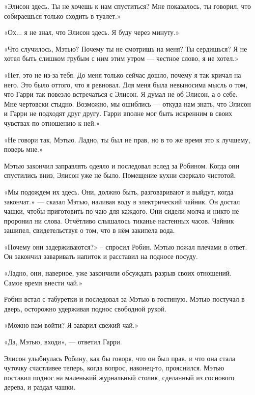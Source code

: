 \documentclass[a4paper,12pt]{book}
\begin{document}
\par
«Элисон здесь. Ты не хочешь к нам спуститься? Мне показалось, ты говорил, что собираешься только сходить в туалет.»
\par
«Ох... я не знал, что Элисон здесь. Я буду через минуту.»
\par
«Что случилось, Мэтью? Почему ты не смотришь на меня? Ты сердишься? Я не хотел быть слишком грубым с ним этим утром — честное слово, я не хотел.»
\par
«Нет, это не из-за тебя. До меня только сейчас дошло, почему я так кричал на него. Это было оттого, что я ревновал. Для меня была невыносима мысль о том, что Гарри так повезло встречаться с Элисон. Я думал не об Элисон, а о себе. Мне чертовски стыдно. Возможно, мы ошиблись — откуда нам знать, что Элисон и Гарри не подходят друг другу. Гарри вполне мог быть искренним в своих чувствах по отношению к ней.»
\par
«Не говори так, Мэтью. Ладно, ты был не прав, но в то же время это к лучшему, поверь мне.»\\
\par
Мэтью закончил заправлять одеяло и последовал вслед за Робином. Когда они спустились вниз, Элисон уже не было. Помещение кухни сверкало чистотой.
\par
«Мы подождем их здесь. Они, должно быть, разговаривают и выйдут, когда закончат.» — сказал Мэтью, наливая воду в электрический чайник. Он достал чашки, чтобы приготовить по чаю для каждого. Они сидели молча и никто не проронил ни слова. Отчётливо слышалось тиканье настенных часов. Чайник зашипел, свидетельствуя о том, что в нём закипела вода.
\par
«Почему они задерживаются?» – спросил Робин. Мэтью пожал плечами в ответ. Он закончил заваривать напиток и расставил на подносе посуду.
\par
«Ладно, они, наверное, уже закончили обсуждать разрыв своих отношений. Самое время внести чай.»
\par
Робин встал с табуретки и последовал за Мэтью в гостиную. Мэтью постучал в дверь, осторожно удерживая поднос свободной рукой.
\par
«Можно нам войти? Я заварил свежий чай.»
\par
«Да, Мэтью, входи», — ответил Гарри.
\par
Элисон улыбнулась Робину, как бы говоря, что он был прав, и что она стала чуточку счастливее теперь, когда вопрос, наконец-то, прояснился. Мэтью поставил поднос на маленький журнальный столик, сделанный из соснового дерева, и раздал чашки.
\end{document}
